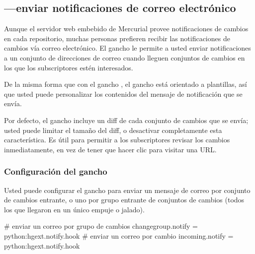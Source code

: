\subsection{---enviar notificaciones de correo
electrónico}

Aunque el servidor web embebido de Mercurial provee notificaciones de
cambios en cada repositorio, muchas personas prefieren recibir las
notificaciones de cambios vía correo electrónico. El gancho
 le permite a usted enviar
notificaciones a un conjunto de direcciones de correo cuando lleguen
conjuntos de cambios en los que los subscriptores estén interesados.

De la misma forma que con el gancho , el gancho
 está orientado a plantillas, así que usted puede
personalizar los contenidos del mensaje de notificación que se envía.

Por defecto, el gancho  incluye un diff de cada conjunto
de cambios que se envía; usted puede limitar el tamaño del diff, o
desactivar completamente esta característica. Es útil para permitir a
los subscriptores revisar los cambios inmediatamente, en vez de tener
que hacer clic para visitar una URL.

\subsubsection{Configuración del gancho }

Usted puede configurar el gancho  para enviar un mensaje
de correo por conjunto de cambios entrante, o uno por grupo entrante
de conjuntos de cambios (todos los que llegaron en un único empuje o
jalado).
\begin{codesample2}
  [hooks]
  # enviar un correo por grupo de cambios
  changegroup.notify = python:hgext.notify.hook
  # enviar un correo por cambio
  incoming.notify = python:hgext.notify.hook
\end{codesample2}

